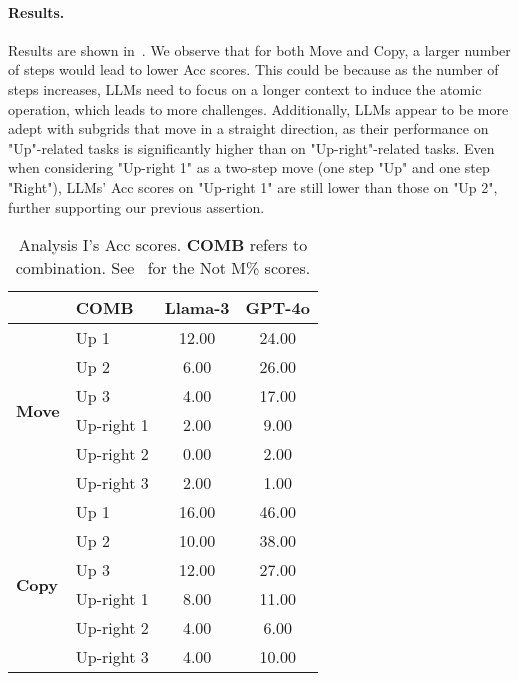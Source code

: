\paragraph{Results.}
Results are shown in~. We observe that 
for both Move and Copy, a larger number of steps would lead to lower Acc scores. This could be because as the number of steps increases, LLMs need to focus on a longer context to induce the atomic operation, which leads to more challenges. Additionally, LLMs appear to be more adept with subgrids that move in a straight direction, as their performance on "Up"-related tasks is significantly higher than on "Up-right"-related tasks. Even when considering "Up-right 1" as a two-step move (one step "Up" and one step "Right"), LLMs' Acc scores on "Up-right 1" are still lower than those on "Up 2", further supporting our previous assertion. %

\begin{table}[tb]
\small
\centering
\setlength{\tabcolsep}{3mm}
\begin{tabular}{llcc}
\toprule
& \textbf{COMB}& \textbf{Llama-3} & \textbf{GPT-4o} \\
\midrule[0.5pt]
\multirow{6}{*}{\textbf{Move}}&Up 1 &12.00&24.00\\
&Up 2 &6.00&26.00\\
&Up 3 &4.00&17.00\\
\cmidrule{2-4}
&Up-right 1 &2.00&9.00\\
&Up-right 2 &0.00&2.00\\
&Up-right 3 &2.00&1.00\\
\midrule[0.5pt]
\multirow{6}{*}{\textbf{Copy}}&Up 1 &16.00&46.00\\
&Up 2 &10.00&38.00\\
&Up 3 &12.00&27.00\\
\cmidrule{2-4}
&Up-right 1 &8.00&11.00\\
&Up-right 2 &4.00&6.00\\
&Up-right 3 &4.00&10.00\\
\bottomrule
\end{tabular}
\caption{Analysis I's Acc scores. \textbf{COMB} refers to combination. See~ for the Not M\% scores.}
\vspace{-0.2in}
\label{tab:controllable}
\end{table}


